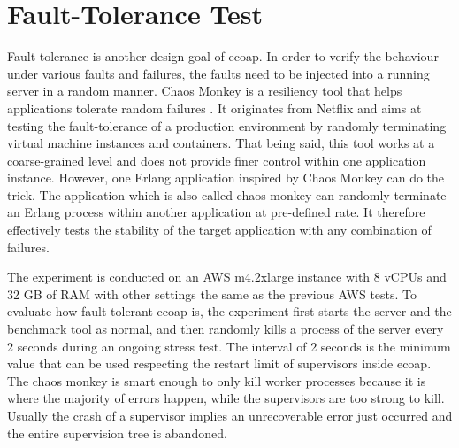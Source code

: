 \section{Fault-Tolerance Test}

Fault-tolerance is another design goal of ecoap. In order to verify the behaviour under various faults and failures, the faults need to be injected into a running server in a random manner. Chaos Monkey is a resiliency tool that helps applications tolerate random failures \autocite{chaos_monkey_netflix}. It originates from Netflix and aims at testing the fault-tolerance of a production environment by randomly terminating virtual machine instances and containers. That being said, this tool works at a coarse-grained level and does not provide finer control within one application instance. However, one Erlang application inspired by Chaos Monkey can do the trick. The application which is also called chaos monkey \autocite{chaos_monkey_erl} can randomly terminate an Erlang process within another application at pre-defined rate. It therefore effectively tests the stability of the target application with any combination of failures. 

The experiment is conducted on an AWS m4.2xlarge instance with 8 vCPUs and 32 GB of RAM with other settings the same as the previous AWS tests. To evaluate how fault-tolerant ecoap is, the experiment first starts the server and the benchmark tool as normal, and then randomly kills a process of the server every 2 seconds during an ongoing stress test. The interval of 2 seconds is the minimum value that can be used respecting the restart limit of supervisors inside ecoap. The chaos monkey is smart enough to only kill worker processes because it is where the majority of errors happen, while the supervisors are too strong to kill. Usually the crash of a supervisor implies an unrecoverable error just occurred and the entire supervision tree is abandoned. 

